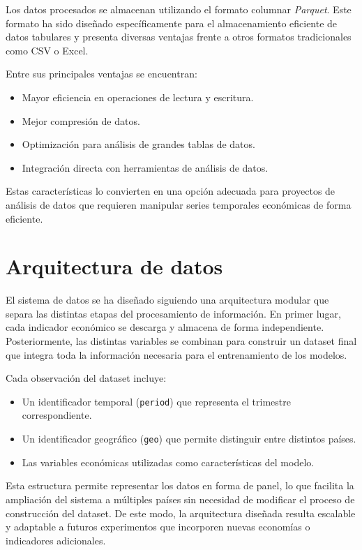 Los datos procesados se almacenan utilizando el formato columnar \textit{Parquet}. Este formato ha sido diseñado específicamente para el almacenamiento eficiente de datos tabulares y presenta diversas ventajas frente a otros formatos tradicionales como CSV o Excel.

Entre sus principales ventajas se encuentran:

\begin{itemize}
    \item Mayor eficiencia en operaciones de lectura y escritura.
    \item Mejor compresión de datos.
    \item Optimización para análisis de grandes tablas de datos.
    \item Integración directa con herramientas de análisis de datos.
\end{itemize}

Estas características lo convierten en una opción adecuada para proyectos de análisis de datos que requieren manipular series temporales económicas de forma eficiente.

\section{Arquitectura de datos}

El sistema de datos se ha diseñado siguiendo una arquitectura modular que separa las distintas etapas del procesamiento de información. En primer lugar, cada indicador económico se descarga y almacena de forma independiente. Posteriormente, las distintas variables se combinan para construir un dataset final que integra toda la información necesaria para el entrenamiento de los modelos.

Cada observación del dataset incluye:

\begin{itemize}
    \item Un identificador temporal (\texttt{period}) que representa el trimestre correspondiente.
    \item Un identificador geográfico (\texttt{geo}) que permite distinguir entre distintos países.
    \item Las variables económicas utilizadas como características del modelo.
\end{itemize}

Esta estructura permite representar los datos en forma de panel, lo que facilita la ampliación del sistema a múltiples países sin necesidad de modificar el proceso de construcción del dataset. De este modo, la arquitectura diseñada resulta escalable y adaptable a futuros experimentos que incorporen nuevas economías o indicadores adicionales.